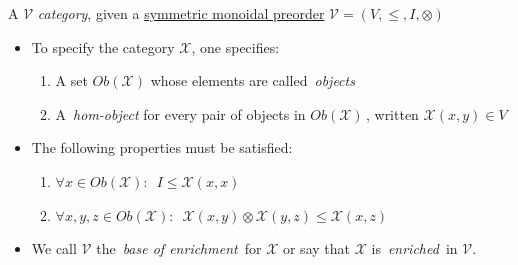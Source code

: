 A $\mathcal{V}$ \emph{category}, given a \hyperref[D2.2]{symmetric monoidal preorder} $\mathcal{V}=(V,\leq,I,\otimes)$

\begin{itemize}
    \item To specify the category $\mathcal{X}$, one specifies:
          \begin{enumerate}
            \item A set $Ob(\mathcal{X})$ whose elements are called \,\emph{objects}\,
            \item A \,\emph{hom-object} for every pair of objects in $Ob(\mathcal{X})$\,, written $\mathcal{X}(x,y) \in V$
          \end{enumerate}
    \item The following properties must be satisfied:
          \begin{enumerate}
            \item $\forall x \in Ob(\mathcal{X}):$ \,$I \leq \mathcal{X}(x,x)$\,
            \item $\forall x,y,z \in Ob(\mathcal{X}):$ \,$\mathcal{X}(x,y)\otimes\mathcal{X}(y,z) \leq \mathcal{X}(x,z)$\,
          \end{enumerate}
    \item We call $\mathcal{V}$ the\, \emph{base of enrichment}\, for $\mathcal{X}$ or say that $\mathcal{X}$ is\, \emph{enriched}\, in $\mathcal{V}$.
  \end{itemize}
